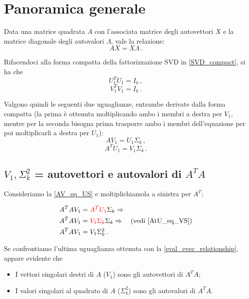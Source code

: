 \section{Panoramica generale}
Data una matrice quadrata $A$ con l'associata matrice degli autovettori $X$ e la 
matrice diagonale degli autovalori $\Lambda$, vale la relazione:
\begin{equation}\label{eval_evec_relationship}
A X = X \Lambda \,.
\end{equation}

Rifacendoci alla forma compatta della fattorizzazione SVD in 
\eqref{SVD_compact}, si ha che
\begin{equation*}
	U_{1}^T U_1 = I_k \,,
\end{equation*}
\begin{equation*}
	V_{1}^T V_1 = I_k \,.
\end{equation*}


Valgono quindi le seguenti due uguaglianze, entrambe derivate dalla forma 
compatta (la prima è ottenuta moltiplicando ambo i membri a destra per $V_1$, 
mentre per la seconda bisogna prima trasporre ambo i membri dell'equazione per 
poi moltiplicarli a destra per $U_1$):
\begin{equation}\label{AV_eq_US}
	A V_1 = U_1 \Sigma_k \,,
\end{equation}
\begin{equation}\label{AtU_eq_VS}
	A^T U_1 = V_1 \Sigma_k \,.
\end{equation}


\subsection{$V_1, \Sigma_{k}^2$ = autovettori e autovalori di $A^T A$}
Consideriamo la \eqref{AV_eq_US} e moltiplichiamola a sinistra per $A^T$:
\begin{flushleft}
\vspace{-20pt}
\begin{align*}
	A^T A V_1 &= \textcolor{red}{A^T U_1} \Sigma_k \Rightarrow \\
	A^T A V_1 &= \textcolor{red}{V_1 \Sigma_k} \Sigma_k \Rightarrow \quad 
\text{(vedi \eqref{AtU_eq_VS}}) \\
	A^T A V_1 &= V_1 \Sigma_{k}^2 \,.
\end{align*}
\end{flushleft}

Se confrontiamo l'ultima uguaglianza ottenuta con la 
\eqref{eval_evec_relationship}, appare evidente che
\begin{itemize}
	\item I vettori singolari destri di $A$ ($V_1$) sono gli autovettori di $A^T 
A$;
	\item I valori singolari al quadrato di $A$ ($\Sigma_{k}^2$) sono gli 
autovalori di $A^T A$.
\end{itemize}


